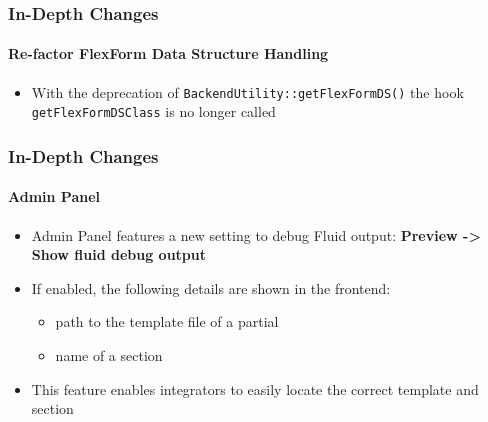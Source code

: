 \begin{frame}[fragile]
	\frametitle{In-Depth Changes}
	\framesubtitle{Re-factor FlexForm Data Structure Handling}


	\begin{itemize}
		\item With the deprecation of \texttt{BackendUtility::getFlexFormDS()} the hook
			\texttt{getFlexFormDSClass} is no longer called

	\end{itemize}

\end{frame}





\begin{frame}[fragile]
	\frametitle{In-Depth Changes}
	\framesubtitle{Admin Panel}

	\begin{itemize}
		\item Admin Panel features a new setting to debug Fluid output:\newline
			\textbf{Preview -> Show fluid debug output}
		\item If enabled, the following details are shown in the frontend:

			\begin{itemize}
				\item path to the template file of a partial
				\item name of a section
			\end{itemize}

		\item This feature enables integrators to easily locate the correct template and section

	\end{itemize}

\end{frame}






